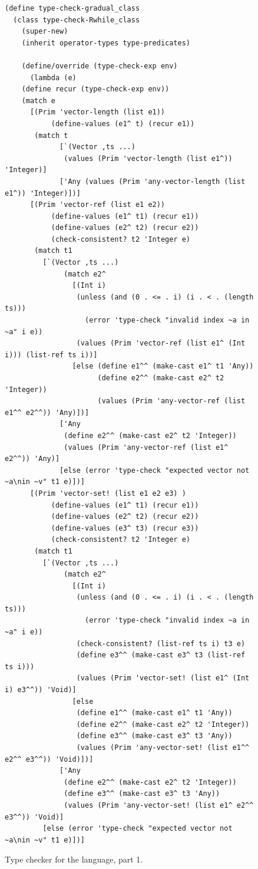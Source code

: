 \documentclass[7x10]{TimesAPriori_MIT}%
\begin{document}
\begin{figure}[tbp]
\begin{lstlisting}[basicstyle=\ttfamily\scriptsize]
(define type-check-gradual_class
  (class type-check-Rwhile_class
    (super-new)
    (inherit operator-types type-predicates)

    (define/override (type-check-exp env)
      (lambda (e)
	(define recur (type-check-exp env))
	(match e
	  [(Prim 'vector-length (list e1))
           (define-values (e1^ t) (recur e1))
	   (match t
             [`(Vector ,ts ...)
              (values (Prim 'vector-length (list e1^)) 'Integer)]
             ['Any (values (Prim 'any-vector-length (list e1^)) 'Integer)])]
	  [(Prim 'vector-ref (list e1 e2))
           (define-values (e1^ t1) (recur e1))
           (define-values (e2^ t2) (recur e2))
           (check-consistent? t2 'Integer e)
	   (match t1
	     [`(Vector ,ts ...)
              (match e2^
                [(Int i)
                 (unless (and (0 . <= . i) (i . < . (length ts)))
                   (error 'type-check "invalid index ~a in ~a" i e))
                 (values (Prim 'vector-ref (list e1^ (Int i))) (list-ref ts i))]
                [else (define e1^^ (make-cast e1^ t1 'Any))
                      (define e2^^ (make-cast e2^ t2 'Integer))
                      (values (Prim 'any-vector-ref (list e1^^ e2^^)) 'Any)])]
             ['Any
              (define e2^^ (make-cast e2^ t2 'Integer))
              (values (Prim 'any-vector-ref (list e1^ e2^^)) 'Any)]
             [else (error 'type-check "expected vector not ~a\nin ~v" t1 e)])]
	  [(Prim 'vector-set! (list e1 e2 e3) )
           (define-values (e1^ t1) (recur e1))
           (define-values (e2^ t2) (recur e2))
           (define-values (e3^ t3) (recur e3))
           (check-consistent? t2 'Integer e)
	   (match t1
	     [`(Vector ,ts ...)
              (match e2^
                [(Int i)
                 (unless (and (0 . <= . i) (i . < . (length ts)))
                   (error 'type-check "invalid index ~a in ~a" i e))
                 (check-consistent? (list-ref ts i) t3 e)
                 (define e3^^ (make-cast e3^ t3 (list-ref ts i)))
                 (values (Prim 'vector-set! (list e1^ (Int i) e3^^)) 'Void)]
                [else
                 (define e1^^ (make-cast e1^ t1 'Any))
                 (define e2^^ (make-cast e2^ t2 'Integer))
                 (define e3^^ (make-cast e3^ t3 'Any))
                 (values (Prim 'any-vector-set! (list e1^^ e2^^ e3^^)) 'Void)])]
             ['Any
              (define e2^^ (make-cast e2^ t2 'Integer))
              (define e3^^ (make-cast e3^ t3 'Any))
              (values (Prim 'any-vector-set! (list e1^ e2^^ e3^^)) 'Void)]
	     [else (error 'type-check "expected vector not ~a\nin ~v" t1 e)])]
\end{lstlisting}
\caption{Type checker for the \LangGrad{} language, part 1.}
\label{fig:type-check-Rgradual-1}
\end{figure}
\end{document}
